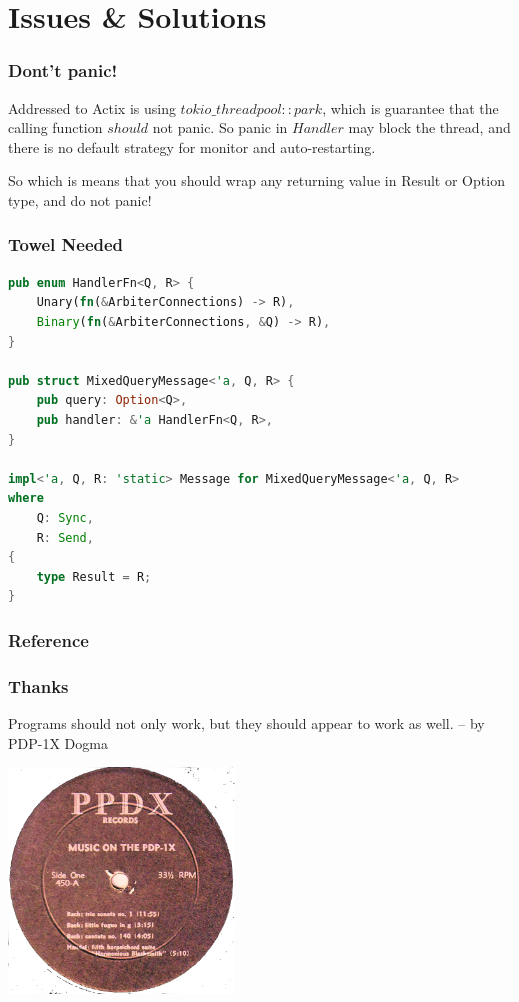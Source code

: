 \documentclass[notheorems, aspectratio=54]{beamer}
\begin{document}
\section{Issues \& Solutions}
\begin{frame}[fragile]
  \frametitle{Dont't panic!}

  Addressed to Actix is using $tokio\_threadpool::park$, which is guarantee that the calling function $should$ not panic. So panic in $Handler$ may block the thread, and there is no default strategy for monitor and auto-restarting.

  So which is means that you should wrap any returning value in Result or Option type, and do not panic!
\end{frame}

\begin{frame}[fragile]
  \frametitle{Towel Needed}

\begin{lstlisting}[language=Rust]
pub enum HandlerFn<Q, R> {
    Unary(fn(&ArbiterConnections) -> R),
    Binary(fn(&ArbiterConnections, &Q) -> R),
}

pub struct MixedQueryMessage<'a, Q, R> {
    pub query: Option<Q>,
    pub handler: &'a HandlerFn<Q, R>,
}

impl<'a, Q, R: 'static> Message for MixedQueryMessage<'a, Q, R>
where
    Q: Sync,
    R: Send,
{
    type Result = R;
}
\end{lstlisting}

\end{frame}

\begin{frame}[allowframebreaks]
    \frametitle{Reference}
  
  
\end{frame}
\begin{frame}
  \frametitle{Thanks}
  \begin{center}
    Programs should not only work, but they should appear to work as well.
    -- by PDP-1X Dogma
  \end{center}
  \begin{center}
    \includegraphics[height=6cm]{./maxresdefault.png}
  \end{center}
\end{frame}
\end{document}
